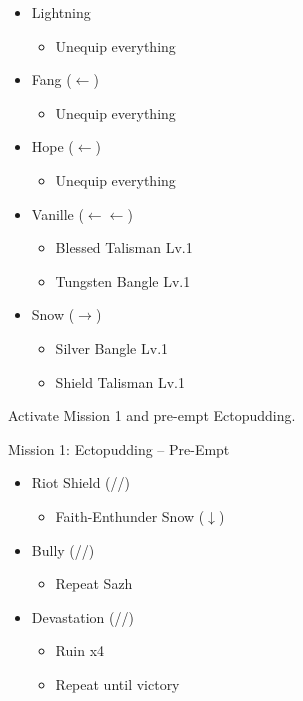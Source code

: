 \begin{menu}
\begin{itemize}
\begin{itemize}
		\end{itemize}
		\equip
		\begin{itemize}
			\item Lightning
				\begin{itemize}
					\item Unequip everything
				\end{itemize}
			\item Fang ($\leftarrow$)
				\begin{itemize}
					\item Unequip everything
				\end{itemize}
			\item Hope ($\leftarrow$)
				\begin{itemize}
					\item Unequip everything
				\end{itemize}
			\item Vanille ($\leftarrow\leftarrow$)
			      \begin{itemize}
				      \item Blessed Talisman Lv.1
				      \item Tungsten Bangle Lv.1
			      \end{itemize}
			\item Snow ($\rightarrow$)
			      \begin{itemize}
				      \item Silver Bangle Lv.1
				      \item Shield Talisman Lv.1
			      \end{itemize}
		\end{itemize}
	\end{itemize}
\end{menu}

Activate Mission 1 and pre-empt Ectopudding.

\renewcommand{\first}{[1] Solidarity (\com/\med/\sen)}
\renewcommand{\second}{[2] Delta Attack (\com/\rav/\sen)}
\renewcommand{\third}{[3] Riot Shield (\syn/\rav/\sen)}
\renewcommand{\fourth}{[4] Bully (\syn/\sab/\com)}
\renewcommand{\fifth}{[5] Devastation (\com/\sab/\com)}
\renewcommand{\sixth}{[6] Dirty Fighting (\com/\sab/\sen)}

\begin{battle}{Mission 1: Ectopudding -- Pre-Empt}
	\begin{itemize}
		\item \third
			\begin{itemize}
				\item Faith-Enthunder Snow ($\downarrow$)
			\end{itemize}
		\item \fourth
			\begin{itemize}
				\item Repeat Sazh
			\end{itemize}
		\item \fifth
			\begin{itemize}
				\item Ruin x4
				\item Repeat until victory
			\end{itemize}
	\end{itemize}
\end{battle}

